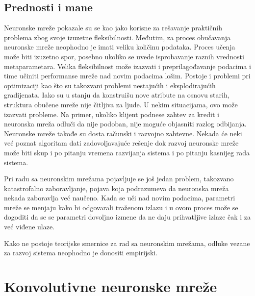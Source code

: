 




\subsection{Prednosti i mane}

Neuronske mreže pokazale su se kao jako korisne za rešavanje praktičnih problema zbog svoje izuzetne fleksibilnosti. Međutim, za proces obučavanja neuronske mreže neophodno je imati veliku količinu podataka. Proces učenja može biti izuzetno spor, posebno ukoliko se uvede isprobavanje raznih vrednosti metaparametara. Velika fleksibilnost može izazvati i preprilagođavanje podacima i time učiniti performanse mreže nad novim podacima lošim. Postoje i problemi pri optimizaciji kao što su takozvani problemi nestajućih i eksplodirajućih gradijenata. Iako su u stanju da konstruišu nove atribute na osnovu starih, struktura obučene mreže nije čitljiva za ljude. U nekim situacijama, ovo može izazvati probleme. Na primer, ukoliko klijent podnese zahtev za kredit i neuronska mreža odluči da nije podoban, nije moguće objasniti razlog odbijanja. Neuronske mreže takođe su dosta računski i razvojno zahtevne. Nekada će neki već poznat algoritam dati zadovoljavajuće rešenje dok razvoj neuronske mreže može biti skup i po pitanju vremena razvijanja sistema i po pitanju kasnijeg rada sistema. 
\par 
Pri radu sa neuronskim mrežama pojavljuje se još jedan problem, takozvano katastrofalno zaboravljanje, pojava koja podrazumeva da neuronska mreža nekada zaboravlja već naučeno. Kada se uči nad novim podacima, parametri mreže se menjaju kako bi odgovarali traženom izlazu i u ovom proces može se dogoditi da se se parametri dovoljno izmene da ne daju prihvatljive izlaze čak i za već viđene ulaze.
\par 
Kako ne postoje teorijske smernice za rad sa neuronskim mrežama, odluke vezane za razvoj sistema neophodno je donositi empirijski.
\section{Konvolutivne neuronske mreže}
\label{sec:cnn}

